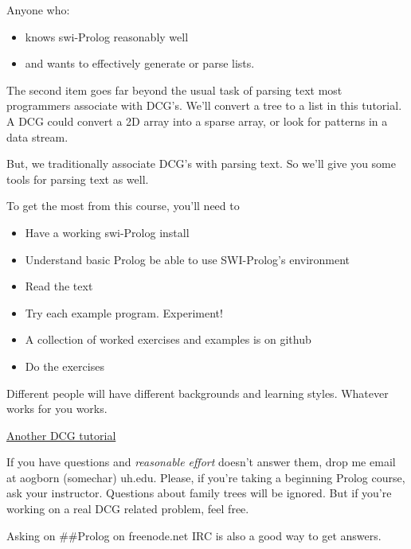 
Anyone who:
\begin{itemize}[nosep]
  \item 
knows swi-Prolog reasonably well
  \item 
and wants to effectively generate or parse lists.
\end{itemize}
The second item goes far beyond the usual task of parsing text most programmers
associate with DCG's. We'll convert a tree to a list in this tutorial. A DCG
could convert a 2D array into a sparse array, or look for patterns in a data
stream.

But, we traditionally associate DCG's with parsing text. So we'll give you some
tools for parsing text as well.



To get the most from this course, you'll need to
\begin{itemize}[nosep]
  \item 
Have a working swi-Prolog install
  \item 
Understand basic Prolog be able to use SWI-Prolog's environment
  \item 
Read the text
  \item 
Try each example program. Experiment!
  \item 
A collection of worked exercises and examples is on github
  \item 
Do the exercises
\end{itemize}

\noindent
Different people will have different backgrounds and learning styles.
Whatever works for you works.


\href{http://rowa.giso.de/languages/toki-pona/dcg/index.php}{Another DCG
tutorial}


If you have questions and \emph{reasonable effort} doesn't answer them, drop me
email at aogborn (somechar) uh.edu. Please, if you're taking a beginning Prolog
course, ask your instructor. Questions about family trees will be ignored. But
if you're working on a real DCG related problem, feel free.

Asking on \#\#Prolog on freenode.net IRC is also a good way to get answers.
